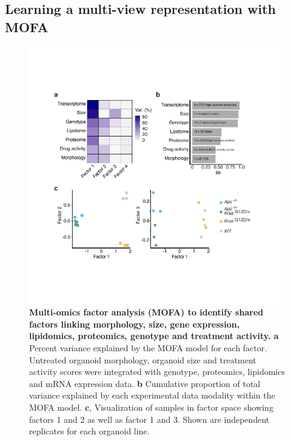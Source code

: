 \begin{flushleft}
\subsection{Learning a multi-view representation with MOFA}

\begin{figure}[h!]
\centering
\includegraphics[width=400pt,
                height=\textheight,
                keepaspectratio]{figures/adenomaprofiling/pdf/fig_1_7.pdf}
\caption[Multi-omics factor analysis (MOFA) to identify shared factors linking morphology, size, gene expression, lipidomics, proteomics, genotype and treatment activity]{\textbf{Multi-omics factor analysis (MOFA) to identify shared factors linking morphology, size, gene expression, lipidomics, proteomics, genotype and treatment activity. a} Percent variance explained by the MOFA model for each factor. Untreated organoid morphology, organoid size and treatment activity scores were integrated with genotype, proteomics, lipidomics and mRNA expression data. \textbf{b} Cumulative proportion of total variance explained by each experimental data modality within the MOFA model. \textbf{c}, Visualization of samples in factor space showing factors 1 and 2 as well as factor 1 and 3. Shown are independent replicates for each organoid line. 
}
\label{fig_170}
\end{figure}
\bigbreak


\end{flushleft}
